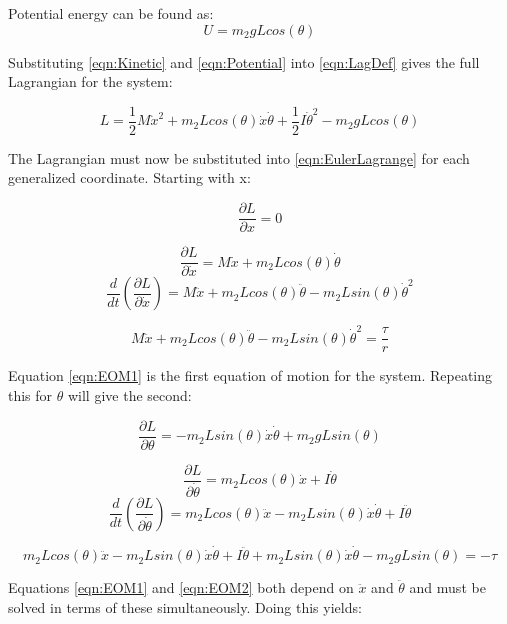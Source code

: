 \documentclass{article}
\begin{document}
	Potential energy can be found as:
	\begin{equation}
		\label{eqn:Potential}
		U = m_2 gLcos(\theta)
	\end{equation}		
	
	Substituting \ref{eqn:Kinetic} and \ref{eqn:Potential} into \ref{eqn:LagDef} gives the full Lagrangian for the system:
	
	\begin{equation}
		\label{eqn:Lagrangian}
		L = \frac{1}{2}M\dot{x}^2 + m_2 Lcos(\theta)\dot{x}\dot{\theta} + \frac{1}{2}I\dot{\theta}^2 - m_2 gLcos(\theta)
	\end{equation}
	
	The Lagrangian must now be substituted into \ref{eqn:EulerLagrange} for each generalized coordinate. Starting with x:
	
	$$\frac{\partial L}{\partial x} = 0$$
	
	$$\frac{\partial L}{\partial \dot{x}} = M\dot{x} + m_2 Lcos(\theta)\dot{\theta}$$
	$$\frac{d}{dt}\left(\frac{\partial L}{\partial \dot{x}}\right) = M\ddot{x} + m_2 Lcos(\theta)\ddot{\theta} - m_2 Lsin(\theta)\dot{\theta}^2$$
	
	\begin{equation}
		\label{eqn:EOM1}
		M\ddot{x} + m_2 Lcos(\theta)\ddot{\theta} - m_2 Lsin(\theta)\dot{\theta}^2 = \frac{\tau}{r}
	\end{equation}		
	
	Equation \ref{eqn:EOM1} is the first equation of motion for the system. Repeating this for $\theta$ will give the second:
	
	$$\frac{\partial L}{\partial \theta} = -m_2 Lsin(\theta) \dot{x}\dot{\theta} + m_2 gLsin(\theta)$$
	
	$$\frac{\partial L}{\partial \dot{\theta}} = m_2 Lcos(\theta)\dot{x} + I\dot{\theta}$$
	$$\frac{d}{dt} \left( \frac{\partial L}{\partial \dot{\theta}} \right) = m_2 Lcos(\theta)\ddot{x} - m_2 Lsin(\theta)\dot{x}\dot{\theta} + I\ddot{\theta}$$
	
	\begin{equation}
		\label{eqn:EOM2}
		m_2 Lcos(\theta)\ddot{x} - m_2 Lsin(\theta)\dot{x}\dot{\theta} + I\ddot{\theta} + m_2 Lsin(\theta) \dot{x}\dot{\theta} - m_2 gLsin(\theta) = -\tau
	\end{equation}
	
	Equations \ref{eqn:EOM1} and \ref{eqn:EOM2} both depend on $\ddot{x}$ and $\ddot{\theta}$ and must be solved in terms of these simultaneously. Doing this yields:
	
\end{document}

